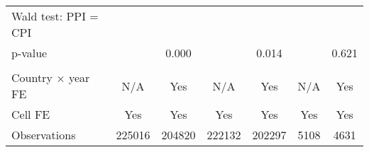 {\begin{tabular}{l*{6}{c}}
Wald test: PPI = CPI&                     &                     &                     &                     &                     &                     \\
\hspace{15pt} p-value&                     &       0.000         &                     &       0.014         &                     &       0.621         \\
\hline \\ Country $\times$ year FE&         N/A         &         Yes         &         N/A         &         Yes         &         N/A         &         Yes         \\
Cell FE             &         Yes         &         Yes         &         Yes         &         Yes         &         Yes         &         Yes         \\
Observations        &      225016         &      204820         &      222132         &      202297         &        5108         &        4631         \\
\hline\hline
\end{tabular}
}
